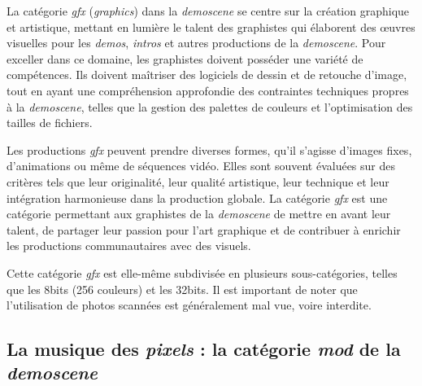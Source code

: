La catégorie \textit{gfx} (\textit{graphics}) dans la \textit{demoscene} se centre sur la création graphique et artistique, mettant en lumière le talent des graphistes qui élaborent des œuvres visuelles pour les \textit{demos}, \textit{intros} et autres productions de la \textit{demoscene}. Pour exceller dans ce domaine, les graphistes doivent posséder une variété de compétences. Ils doivent maîtriser des logiciels de dessin et de retouche d'image, tout en ayant une compréhension approfondie des contraintes techniques propres à la \textit{demoscene}, telles que la gestion des palettes de couleurs et l'optimisation des tailles de fichiers.





Les productions \textit{gfx} peuvent prendre diverses formes, qu'il s'agisse d'images fixes, d'animations ou même de séquences vidéo. Elles sont souvent évaluées sur des critères tels que leur originalité, leur qualité artistique, leur technique et leur intégration harmonieuse dans la production globale. La catégorie \textit{gfx} est une catégorie permettant aux graphistes de la \textit{demoscene} de mettre en avant leur talent, de partager leur passion pour l'art graphique et de contribuer à enrichir les productions communautaires avec des visuels.



Cette catégorie \textit{gfx} est elle-même subdivisée en plusieurs sous-catégories, telles que les 8bits (256 couleurs) et les 32bits. Il est important de noter que l'utilisation de photos scannées est généralement mal vue, voire interdite.


\subsection*{La musique des \textit{pixels} : la catégorie \textit{mod} de la \textit{demoscene}}

